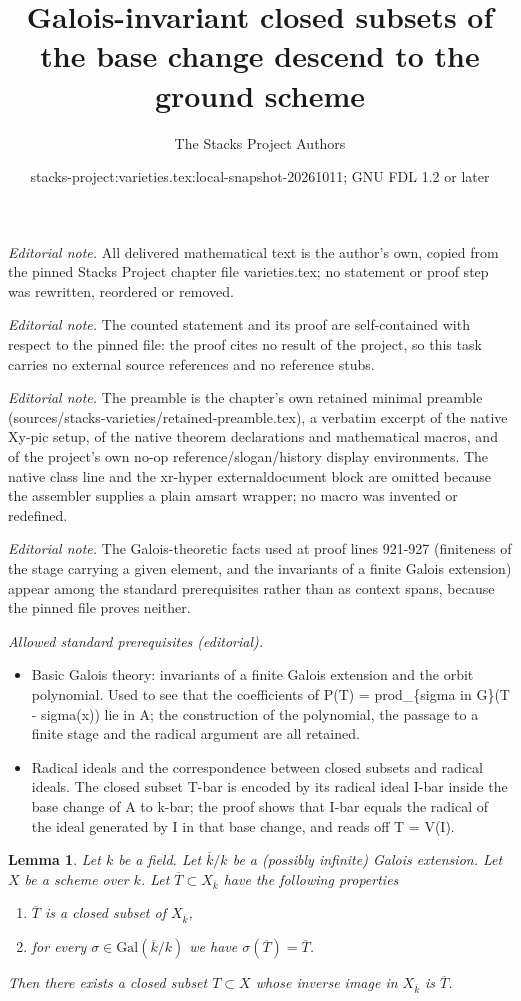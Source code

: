 \documentclass[10pt,a4paper]{amsart}
\title{Galois-invariant closed subsets of the base change descend to the ground scheme}
\author{The Stacks Project Authors}
\date{stacks-project:varieties.tex:local-snapshot-20261011; GNU FDL 1.2 or later}
\theoremstyle{plain}
\newtheorem{lemma}[subsection]{Lemma}
\theoremstyle{definition}
\theoremstyle{remark}
\numberwithin{equation}{subsection}
\begin{document}
\maketitle
\noindent\textit{Editorial note.} All delivered mathematical text is the author's own, copied from the pinned Stacks Project chapter file varieties.tex; no statement or proof step was rewritten, reordered or removed.\par\medskip
\noindent\textit{Editorial note.} The counted statement and its proof are self-contained with respect to the pinned file: the proof cites no result of the project, so this task carries no external source references and no reference stubs.\par\medskip
\noindent\textit{Editorial note.} The preamble is the chapter's own retained minimal preamble (sources/stacks-varieties/retained-preamble.tex), a verbatim excerpt of the native Xy-pic setup, of the native theorem declarations and mathematical macros, and of the project's own no-op reference/slogan/history display environments. The native class line and the xr-hyper externaldocument block are omitted because the assembler supplies a plain amsart wrapper; no macro was invented or redefined.\par\medskip
\noindent\textit{Editorial note.} The Galois-theoretic facts used at proof lines 921-927 (finiteness of the stage carrying a given element, and the invariants of a finite Galois extension) appear among the standard prerequisites rather than as context spans, because the pinned file proves neither.\par\medskip
\noindent\textit{Allowed standard prerequisites (editorial).}\begin{itemize}
\item Basic Galois theory: invariants of a finite Galois extension and the orbit polynomial. Used to see that the coefficients of P(T) = prod\_\{sigma in G\}(T - sigma(x)) lie in A; the construction of the polynomial, the passage to a finite stage and the radical argument are all retained.
\item Radical ideals and the correspondence between closed subsets and radical ideals. The closed subset T-bar is encoded by its radical ideal I-bar inside the base change of A to k-bar; the proof shows that I-bar equals the radical of the ideal generated by I in that base change, and reads off T = V(I).
\end{itemize}\medskip
\begin{lemma}
\label{lemma-closed-fixed-by-Galois}
Let $k$ be a field. Let $\overline{k}/k$ be a (possibly infinite)
Galois extension. Let $X$ be a scheme over $k$. Let
$\overline{T} \subset X_{\overline{k}}$ have the following properties
\begin{enumerate}
\item $\overline{T}$ is a closed subset of $X_{\overline{k}}$,
\item for every $\sigma \in \text{Gal}(\overline{k}/k)$
we have $\sigma(\overline{T}) = \overline{T}$.
\end{enumerate}
Then there exists a closed subset $T \subset X$ whose inverse image
in $X_{\overline{k}}$ is $\overline{T}$.
\end{lemma}
\end{document}
